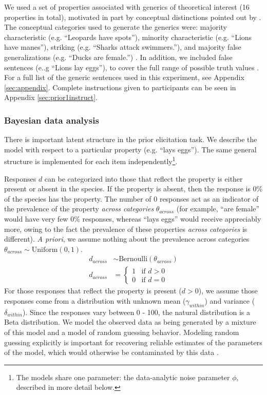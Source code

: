 \documentclass[10pt,letterpaper]{article}
\begin{document}
We used a set of properties associated with generics of theoretical interest (16 properties in total), motivated in part by conceptual distinctions pointed out by . 
The conceptual categories used to generate the generics were: majority characteristic (e.g. ``Leopards have spots''), minority characteristic (e.g. ``Lions have manes''), striking (e.g. ``Sharks attack swimmers.''), and majority false generalizations (e.g. ``Ducks are female.'') \cite{Prasada2013}. In addition, we included false sentences (e..g ``Lions lay eggs''), to cover the full range of possible truth values .
For a full list of the generic sentences used in this experiment, see Appendix \ref{sec:appendix}.
Complete instructions given to participants can be seen in Appendix \ref{sec:prior1instruct}.



\subsubsection{Bayesian data analysis}
\label{sec:bda1}

There is important latent structure in the prior elicitation task. We describe the model with respect to a particular property (e.g. ``lays eggs''). 
The same general structure is implemented for each item independently\footnote{The models share one parameter: the data-analytic noise parameter $\phi$, described in more detail below.}. 

Responses $d$ can be categorized into those that reflect the property is either present or absent in the species. 
If the property is absent, then the response is 0\% of the species has the property. 
The number of 0 responses act as an indicator of the prevalence of the property \emph{across categories} $\theta_{across}$ (for example, ``are female'' would have very few 0\% responses, whereas ``lays eggs'' would receive appreciably more, owing to the fact the prevalence of these properties \emph{across categories} is different). \emph{A priori}, we assume nothing about the prevalence across categories $\theta_{across} \sim \text{Uniform} (0, 1)$. 
%
\begin{align*}
d_{across} & \sim \text{Bernoulli}(\theta_{across}) \\
d_{across} & = \begin{cases}
				1 & \mbox{if } d > 0 \\
				0 & \mbox{if } d = 0 
				\end{cases}
\end{align*}
%
For those responses that reflect the property is present ($d > 0$), we assume those responses come from a distribution with unknown mean ($\gamma_{within}$) and variance ($\delta_{within}$). 
Since the responses vary between 0 - 100, the natural distribution is a Beta distribution. 
We model the observed data as being generated by a mixture of this model and a model of random guessing behavior. 
Modeling random guessing explicitly is important for recovering reliable estimates of the parameters of the model, which would otherwise be contaminated by this data \cite{LW2014}. 
\end{document}
